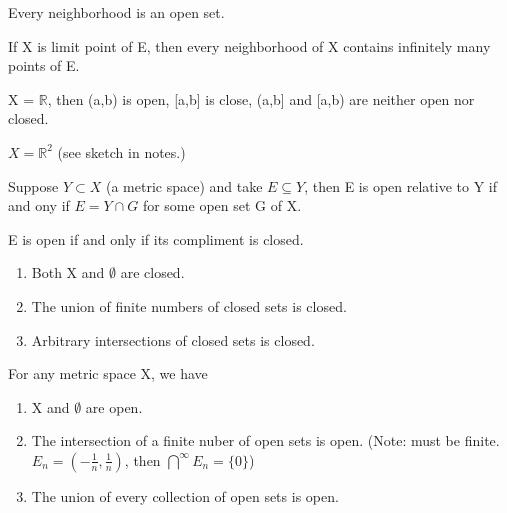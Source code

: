 \documentclass[11pt,fleqn]{book} %
\begin{document}
\begin{theorem}
	Every neighborhood is an open set.
\end{theorem}

\begin{theorem}
	If X is limit point of E, then every neighborhood of X contains infinitely many points of E. 
\end{theorem}

\begin{example}
	X = $\mathbb{R}$, then (a,b) is open, [a,b] is close, (a,b] and [a,b) are neither open nor closed.
\end{example}

\begin{example}
	$X = \mathbb{R}^2$ (see sketch in notes.)
\end{example}

\begin{theorem}
	Suppose $Y \subset X$ (a metric space) and take $E \subseteq Y$, then E is open relative to Y if and ony if $E=Y\cap G$ for some open set G of X.
\end{theorem}

\begin{theorem}
	E is open if and only if its compliment is closed.
\end{theorem}

\begin{corollary}
	\begin{enumerate}[label = \alph*)]
		\item Both X and $\emptyset$ are closed.
		\item The union of finite numbers of closed sets is closed.
		\item Arbitrary intersections of closed sets is closed.
	\end{enumerate}
\end{corollary}

\begin{theorem}
	For any metric space X, we have

	\begin{enumerate}[label = \alph*)]
		\item X and $\emptyset$ are open.
		\item The intersection of a finite nuber of open sets is open. (Note: must be finite. $E_n = (-\frac{1}{n}, \frac{1}{n})$, then $\bigcap\limits^\infty E_n = \{0\}$)
		\item The union of every collection of open sets is open. 
	\end{enumerate}
\end{theorem}
\end{document}
